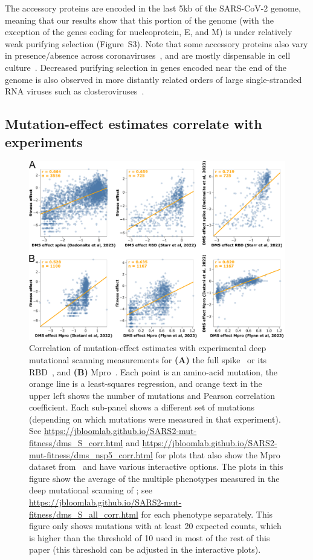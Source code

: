 \documentclass[9pt,twocolumn,twoside]{gsajnl_modified}
\begin{document}
The accessory proteins are encoded in the last 5kb of the SARS-CoV-2 genome, meaning that our results show that this portion of the genome (with the exception of the genes coding for nucleoprotein, E, and M) is under relatively weak purifying selection (Figure~S3).
Note that some accessory proteins also vary in presence/absence across coronaviruses~\citep{v2021coronavirus,llanes2020betacoronavirus}, and are mostly dispensable in cell culture~\citep{mcgrath2022sars,silvas2021contribution,liu2022live,liu2014accessory}.
Decreased purifying selection in genes encoded near the end of the genome is also observed in more distantly related orders of large single-stranded RNA viruses such as closteroviruses~\citep{wang2011genetic, dawson2013virus}.

\subsection*{Mutation-effect estimates correlate with experiments}

\begin{figure}
\centering
\includegraphics[width=0.7\linewidth]{figs/dms.png}
\caption{
Correlation of mutation-effect estimates with experimental deep mutational scanning measurements for {\bf (A)} the full spike~\citep{dadonaite2023pseudovirus} or its RBD~\citep{starr2022deep}, and {\bf (B)} Mpro~\citep{flynn2023,iketani2022functional}.
Each point is an amino-acid mutation, the orange line is a least-squares regression, and orange text in the upper left shows the number of mutations and Pearson correlation coefficient.
Each sub-panel shows a different set of mutations (depending on which mutations were measured in that experiment).
See \url{https://jbloomlab.github.io/SARS2-mut-fitness/dms_S_corr.html} and \url{https://jbloomlab.github.io/SARS2-mut-fitness/dms_nsp5_corr.html} for plots that also show the Mpro dataset from~\citep{flynn2022} and have various interactive options.
The plots in this figure show the average of the multiple phenotypes measured in the deep mutational scanning of \cite{starr2022deep}; see \url{https://jbloomlab.github.io/SARS2-mut-fitness/dms_S_all_corr.html} for each phenotype separately.
This figure only shows mutations with at least 20 expected counts, which is higher than the threshold of 10 used in most of the rest of this paper (this threshold can be adjusted in the interactive plots).
\label{fig:dms}
}
\end{figure}
\end{document}
